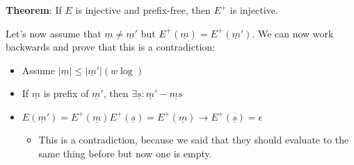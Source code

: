 \documentclass[11pt,a4paper,titlepage,dvipsnames,cmyk]{scrartcl}
\begin{document}
\textbf{Theorem}: If $E$ is injective and prefix-free, then $E^+$ is
injective.

Let's now assume that $\underline m \not = \underline m'$ but
$E^+(\underline m) = E^+(\underline m')$. We can now work backwards and
prove that this is a contradiction:
\begin{itemize}
    \item Assume $|\underline m| \le |\underline m'| (w\log)$
    \item If $\underline m$ is prefix of $\underline m'$, then $\exists
        \underline s : \underline m' - \underline{ms}$
    \item $E(\underline m') = E^+(\underline m)E^+(\underline s) =
        E^+(\underline m) \rightarrow E^+(\underline s) = \epsilon$
        \begin{itemize}
            \item This is a contradiction, because we said that they
                should evaluate to the same thing before but now one is
                empty.
        \end{itemize}
\end{itemize}
\end{document}
